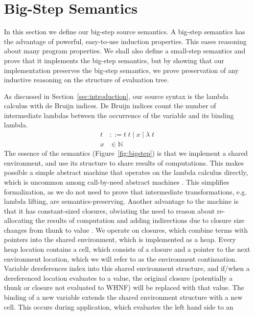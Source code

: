 \section{\ce Big-Step Semantics} \label{sec:cem_big}

In this section we define our big-step source semantics. A big-step semantics
has the advantage of powerful, easy-to-use induction properties. This eases
reasoning about many program properties. We shall also define a small-step
semantics and prove that it implements the big-step semantics, but by showing
that our implementation preserves the big-step semantics, we prove preservation
of any inductive reasoning on the structure of evaluation tree.  

As discussed in Section~\ref{sec:introduction}, our source syntax is the lambda
calculus with de Bruijn indices. De Bruijn indices count the number of
intermediate lambdas between the occurrence of the variable and its binding
lambda.  
\begin{align*}
 t &::= t \; t \; | \; x \; | \;  \lambda \; t \\
 x &\in \mathbb{N}
\end{align*}
The essence of the \ce semantics (Figure~\ref{fig:bigstep}) is that we implement a shared
environment, and use its structure to share results of computations. This makes
possible a simple abstract machine that operates on the lambda calculus directly,
which is uncommon among call-by-need abstract machines
\cite{jonesstg,launchburynatural,TIM,johnsson1984efficient}. This simplifies
formalization, as we do not need to prove that intermediate transformations,
e.g. lambda lifting, are semantics-preserving. Another advantage to the \ce
machine is that it has constant-sized closures, obviating the need to reason
about re-allocating the results of computation and adding indirections due to
closure size changes from thunk to value \cite{jonesstg}. We operate on
closures, which combine terms with pointers into the shared environment, which
is implemented as a heap. Every heap location contains a cell, which consists of
a closure and a pointer to the next environment location, which we will refer to
as the environment continuation.  Variable dereferences index into this shared
environment structure, and if/when a dereferenced location evaluates to a value,
the original closure (potentially a thunk or closure not evaluated to WHNF) will
be replaced with that value. The binding of a new variable extends the shared
environment structure with a new
cell. This occurs during application, which evaluates the left hand side to an
